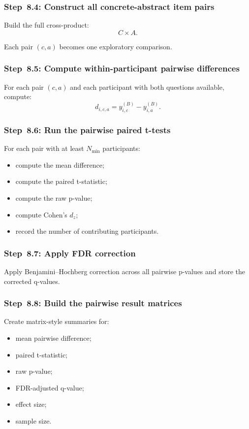 \subsubsection{Step~8.4: Construct all concrete-abstract item pairs}
Build the full cross-product:
\begin{equation}
C \times A.
\end{equation}

Each pair \((c,a)\) becomes one exploratory comparison.

\subsubsection{Step~8.5: Compute within-participant pairwise differences}
For each pair \((c,a)\) and each participant with both questions available, compute:
\begin{equation}
d_{i,c,a} = y^{(B)}_{i,c} - y^{(B)}_{i,a}.
\end{equation}

\subsubsection{Step~8.6: Run the pairwise paired t-tests}
For each pair with at least \(N_{\min}\) participants:
\begin{itemize}
    \item compute the mean difference;
    \item compute the paired t-statistic;
    \item compute the raw p-value;
    \item compute Cohen's \(d_z\);
    \item record the number of contributing participants.
\end{itemize}

\subsubsection{Step~8.7: Apply FDR correction}
Apply Benjamini--Hochberg correction across all pairwise p-values and store the corrected q-values.

\subsubsection{Step~8.8: Build the pairwise result matrices}
Create matrix-style summaries for:
\begin{itemize}
    \item mean pairwise difference;
    \item paired t-statistic;
    \item raw p-value;
    \item FDR-adjusted q-value;
    \item effect size;
    \item sample size.
\end{itemize}

